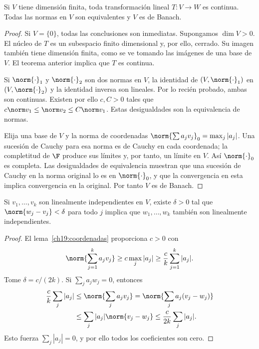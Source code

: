\begin{corolario}\label{ch22:lineal-finito}
Si $V$ tiene dimensión finita, toda transformación lineal $T:V\to W$ es continua. Todas las normas en $V$ son equivalentes y $V$ es de Banach.
\end{corolario}
\begin{proof}
Si $V=\{0\}$, todas las conclusiones son inmediatas. Supongamos $\dim V>0$. El núcleo de $T$ es un subespacio finito dimensional y, por ello, cerrado. Su imagen también tiene dimensión finita, como se ve tomando las imágenes de una base de $V$. El teorema anterior implica que $T$ es continua.

Si $\norm{\cdot}_1$ y $\norm{\cdot}_2$ son dos normas en $V$, la identidad de $(V,\norm{\cdot}_1)$ en $(V,\norm{\cdot}_2)$ y la identidad inversa son lineales. Por lo recién probado, ambas son continuas. Existen por ello $c,C>0$ tales que $c\norm v_1\leq\norm v_2\leq C\norm v_1$. Estas desigualdades son la equivalencia de normas.

Elija una base de $V$ y la norma de coordenadas $\norm{\sum a_jv_j}_0=\max_j|a_j|$. Una sucesión de Cauchy para esa norma es de Cauchy en cada coordenada; la completitud de $\F$ produce sus límites y, por tanto, un límite en $V$. Así $\norm{\cdot}_0$ es completa. Las desigualdades de equivalencia muestran que una sucesión de Cauchy en la norma original lo es en $\norm{\cdot}_0$, y que la convergencia en esta implica convergencia en la original. Por tanto $V$ es de Banach.
\end{proof}

\begin{proposicion}\label{ch22:independencia}
Si $v_1,\ldots,v_k$ son linealmente independientes en $V$, existe $\delta>0$ tal que $\norm{w_j-v_j}<\delta$ para todo $j$ implica que $w_1,\ldots,w_k$ también son linealmente independientes.
\end{proposicion}
\begin{proof}
El lema~\ref{ch19:coordenadas} proporciona $c>0$ con
\[
 \norm{\sum_{j=1}^k a_jv_j}\geq c\max_j|a_j|
 \geq\frac ck\sum_{j=1}^k|a_j|.
\]
Tome $\delta=c/(2k)$. Si $\sum_j a_jw_j=0$, entonces
\begin{align*}
 \frac ck\sum_j|a_j|
 &\leq\norm{\sum_j a_jv_j}
 =\norm{\sum_j a_j(v_j-w_j)}\\
 &\leq\sum_j|a_j|\norm{v_j-w_j}
 \leq\frac c{2k}\sum_j|a_j|.
\end{align*}
Esto fuerza $\sum_j|a_j|=0$, y por ello todos los coeficientes son cero.
\end{proof}

